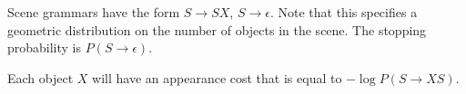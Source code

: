 
Scene grammars have the form $S\to SX$, $S\to \epsilon$. Note that
this specifies a geometric distribution on the number of objects in
the scene. The stopping probability is $P(S\to \epsilon)$.

Each object $X$ will have an appearance cost that is equal to $-\log
P(S\to XS)$.

